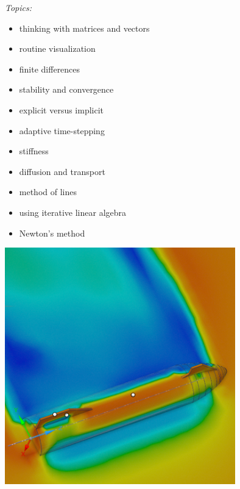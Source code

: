 \documentclass[12pt]{amsart}
\begin{document}
\bigskip
\noindent
\begin{minipage}[t]{0.5\textwidth} \emph{Topics:}
\begin{itemize}
\item thinking with matrices and vectors
\item routine visualization
\item finite differences
\item stability and convergence
\item explicit versus implicit
\item adaptive time-stepping
\item stiffness
\item diffusion and transport
\item method of lines
\item using iterative linear algebra
\item Newton's method
\end{itemize}
\end{minipage}
\begin{minipage}[t]{0.5\textwidth}
\phantom{foo}

\hfill \includegraphics[width=0.75\textwidth]{../../images/Starship-simul-3.png}
\end{minipage}

\end{document}
